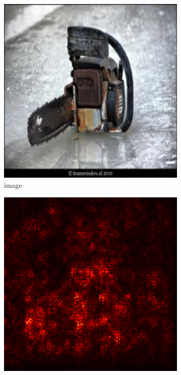 \documentclass[preprint,12pt]{elsarticle}
\begin{document}
\begin{figure}
    \centering
    \begin{subfigure}{0.14\linewidth}
        \centering
        \includegraphics[width=\linewidth]{../visualizations/examples/imagenette/resnet18/images/0.png}
        \caption{image}
    \end{subfigure}
    \hfill
    \begin{subfigure}{0.14\linewidth}
        \centering
        \includegraphics[width=\linewidth]{../visualizations/examples/imagenette/resnet18/saliency_map/0.png}

\end{subfigure}
\end{figure}
\end{document}
